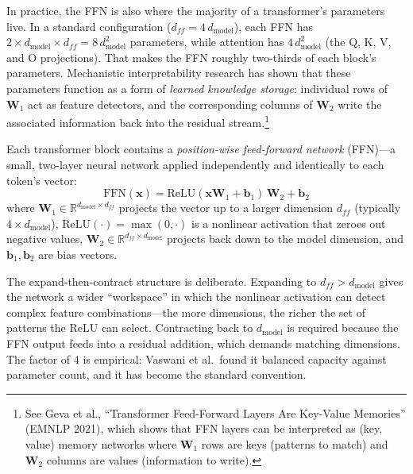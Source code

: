 In practice, the FFN is also where the majority of a transformer's parameters live. In a standard configuration ($d_{ff} = 4\,d_{\text{model}}$), each FFN has $2 \times d_{\text{model}} \times d_{ff} = 8\,d_{\text{model}}^2$ parameters, while attention has $4\,d_{\text{model}}^2$ (the Q, K, V, and O projections). That makes the FFN roughly two-thirds of each block's parameters. Mechanistic interpretability research has shown that these parameters function as a form of \emph{learned knowledge storage}: individual rows of $\mathbf{W}_1$ act as feature detectors, and the corresponding columns of $\mathbf{W}_2$ write the associated information back into the residual stream.\footnote{See Geva et al., ``Transformer Feed-Forward Layers Are Key-Value Memories'' (EMNLP 2021), which shows that FFN layers can be interpreted as (key, value) memory networks where $\mathbf{W}_1$ rows are keys (patterns to match) and $\mathbf{W}_2$ columns are values (information to write).}

Each transformer block contains a \emph{position-wise feed-forward network} (FFN)---a small, two-layer neural network applied independently and identically to each token's vector:
\begin{equation}
\label{eq:ffn}
\text{FFN}(\mathbf{x}) = \text{ReLU}(\mathbf{x}\mathbf{W}_1 + \mathbf{b}_1)\,\mathbf{W}_2 + \mathbf{b}_2
\end{equation}
where $\mathbf{W}_1 \in \mathbb{R}^{d_{\text{model}} \times d_{ff}}$ projects the vector up to a larger dimension $d_{ff}$ (typically $4 \times d_{\text{model}}$), $\text{ReLU}(\cdot) = \max(0, \cdot)$ is a nonlinear activation that zeroes out negative values, $\mathbf{W}_2 \in \mathbb{R}^{d_{ff} \times d_{\text{model}}}$ projects back down to the model dimension, and $\mathbf{b}_1, \mathbf{b}_2$ are bias vectors.

The expand-then-contract structure is deliberate. Expanding to $d_{ff} > d_{\text{model}}$ gives the network a wider ``workspace'' in which the nonlinear activation can detect complex feature combinations---the more dimensions, the richer the set of patterns the ReLU can select. Contracting back to $d_{\text{model}}$ is required because the FFN output feeds into a residual addition, which demands matching dimensions. The factor of 4 is empirical: Vaswani et al.\ found it balanced capacity against parameter count, and it has become the standard convention.


